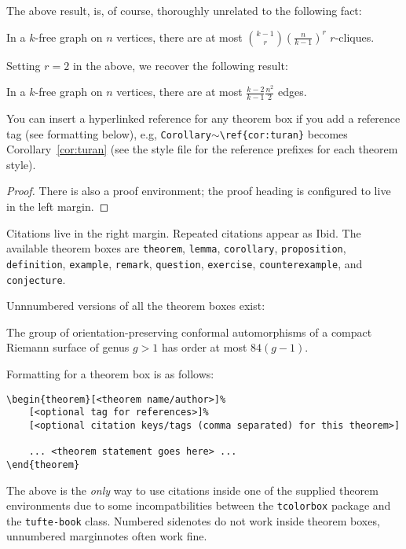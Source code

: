 \documentclass[justified, nofonts, notitlepage, openany, debug, nobib]{tufte-book}
\begin{document}
The above result, is, of course, thoroughly unrelated to the following fact:
\begin{lemma}
    In a $k$-free graph on $n$ vertices, there are at most $\binom{k-1}{r} (\frac{n}{k-1})^r$ $r$-cliques.
\end{lemma}
Setting $r=2$ in the above, we recover the following result:
\begin{corollary}
    In a $k$-free graph on $n$ vertices, there are at most $\frac{k-2}{k-1} \frac{n^2}{2}$ edges. 
\end{corollary}
You can insert a hyperlinked reference for any theorem box if you add a reference tag (see formatting below), e.g, \verb_Corollary_$\sim$\verb_\ref{cor:turan}_ becomes Corollary~\ref{cor:turan} (see the style file for the reference prefixes for each theorem style).
\begin{proof}
    There is also a proof environment; the proof heading is configured to live in the left margin.
\end{proof}

Citations live in the right margin\cite[232]{fantechi}. Repeated citations appear as Ibid\cite{fantechi}. The available theorem boxes are \texttt{theorem}, \texttt{lemma}, \texttt{corollary}, \texttt{proposition}, \texttt{definition}, \texttt{example}, \texttt{remark}, \texttt{question}, \texttt{exercise}, \texttt{counterexample}, and \texttt{conjecture}. 

Unnnumbered versions of all the theorem boxes exist:

\begin{proposition*}
    The group of orientation-preserving conformal automorphisms of a compact Riemann surface of genus $g > 1$ has order at most $84(g-1)$.
\end{proposition*}

Formatting for a theorem box is as follows:
\begin{verbatim}
\begin{theorem}[<theorem name/author>]%
    [<optional tag for references>]%
    [<optional citation keys/tags (comma separated) for this theorem>]

    ... <theorem statement goes here> ...
\end{theorem}
\end{verbatim}
The above is the \textit{only} way to use citations inside one of the supplied theorem environments due to some incompatbilities between the \texttt{tcolorbox} package and the \texttt{tufte-book} class. Numbered sidenotes do not work inside theorem boxes, unnumbered marginnotes often work fine.
\end{document}

